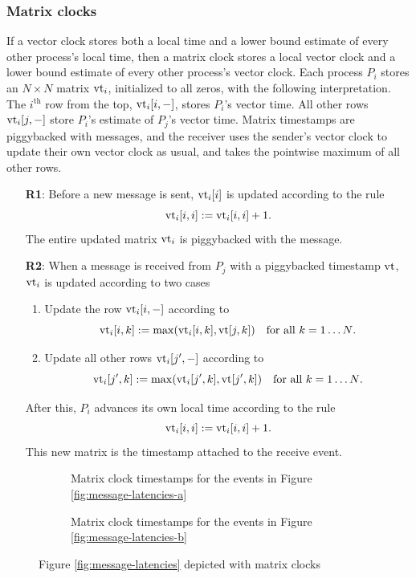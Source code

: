 \documentclass[]             %
{NASA}                       %
\theoremstyle{definition}
\begin{document}
\subsubsection{Matrix clocks}
\label{sssec:matrix-clocks}
If a vector clock stores both a local time and a lower bound estimate
of every other process's local time, then a matrix clock stores a
local vector clock and a lower bound estimate of every other process's
vector clock. Each process $P_i$ stores an $N\times{}N$ matrix
$\textrm{vt}_i$, initialized to all zeros, with the following
interpretation. The $i^{\textrm{th}}$ row from the top, $\textrm{vt}_i[i, -]$,
stores $P_i$'s vector time. All other rows $\textrm{vt}_i[j,-]$ store $P_i$'s
estimate of $P_j$'s vector time. Matrix timestamps are piggybacked
with messages, and the receiver uses the sender's vector clock to
update their own vector clock as usual, and takes the pointwise
maximum of all other rows.

\begin{enumerate}
\item[\textbf{R1}:] Before a new message is sent, $\textrm{vt}_i[i]$ is updated according to the rule
  \[\textrm{vt}_i[i,i] := \textrm{vt}_i[i,i] + 1.\]
  The entire updated matrix $\textrm{vt}_i$ is piggybacked with the message.
\item[\textbf{R2}:] When a message is received from $P_j$ with a piggybacked timestamp $\textrm{vt}$,
  $\textrm{vt}_i$ is updated according to two cases
  \begin{enumerate}
  \item Update the row $\textrm{vt}_i[i, -]$ according to
    \[\textrm{vt}_i[i, k] := \max(\textrm{vt}_i[i,k], \textrm{vt}[j, k]) \quad \textrm{for all $k = 1\ldots N$}.\]
  \item Update all other rows $\textrm{vt}_i[j', -]$ according to
    \[\textrm{vt}_i[j', k] := \max(\textrm{vt}_i[j',k], \textrm{vt}[j', k]) \quad \textrm{for all $k = 1\ldots N$}.\]
  \end{enumerate}
  After this, $P_i$ advances its own local time according to the rule
  \[ \textrm{vt}_i[i,i] := \textrm{vt}_i[i,i] + 1.\]
  This new matrix is the timestamp attached to the receive event.
\end{enumerate}

\begin{figure}[p]
  \begingroup
  \setlength\belowcaptionskip{4ex}
  \begin{subfigure}{1\textwidth}
    \caption{Matrix clock timestamps for the events in Figure \ref{fig:message-latencies-a}}
    \label{fig:message-latencies-matrix-a}
  \end{subfigure}
  \begin{subfigure}{1\textwidth}
    \caption{Matrix clock timestamps for the events in Figure \ref{fig:message-latencies-b}}
    \label{fig:message-latencies-matrix-b}
  \end{subfigure}
  \caption{Figure \ref{fig:message-latencies} depicted with matrix clocks}
  \label{fig:message-latencies-matrix}
  \endgroup
\end{figure}
\end{document}
